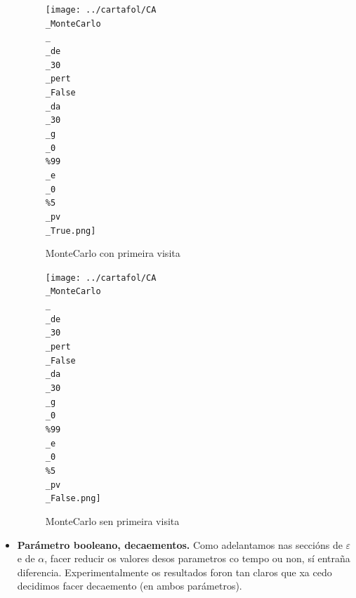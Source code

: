 \documentclass{article}
\begin{document}
\begin{itemize}
		\begin{figure}[htbp]
    \centering
    \begin{minipage}{0.45\textwidth}
        \centering
	\texttt{[image: ../cartafol/CA\\\_MonteCarlo\\\_\\\_de\\\_30\\\_pert\\\_False\\\_da\\\_30\\\_g\\\_0\\\%99\\\_e\\\_0\\\%5\\\_pv\\\_True.png]}
\caption*{MonteCarlo con primeira visita}

    \end{minipage}
    \hfill
    \begin{minipage}{0.45\textwidth}
        \centering
	\texttt{[image: ../cartafol/CA\\\_MonteCarlo\\\_\\\_de\\\_30\\\_pert\\\_False\\\_da\\\_30\\\_g\\\_0\\\%99\\\_e\\\_0\\\%5\\\_pv\\\_False.png]}
\caption*{MonteCarlo sen primeira visita}

    \end{minipage}
\end{figure}


	\item \textbf{Parámetro booleano, decaementos.} Como adelantamos nas seccións de $\varepsilon$ e de $\alpha$, facer reducir os valores desos parametros co tempo ou non, sí entraña diferencia. Experimentalmente os resultados foron tan claros que xa cedo decidimos facer decaemento (en ambos parámetros).

\end{itemize}
\end{document}
